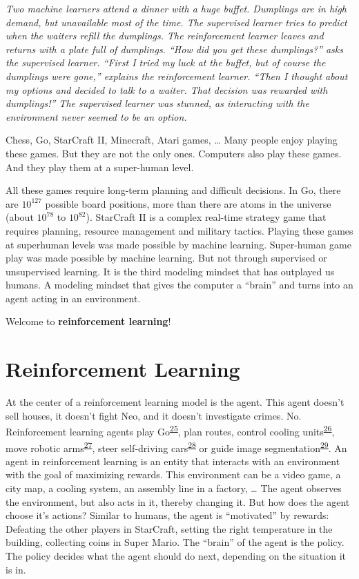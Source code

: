 \documentclass[
  10pt,
]{scrbook}
\begin{document}
\emph{Two machine learners attend a dinner with a huge buffet.
Dumplings are in high demand, but unavailable most of the time.
The supervised learner tries to predict when the waiters refill the dumplings.
The reinforcement learner leaves and returns with a plate full of dumplings.
``How did you get these dumplings?'' asks the supervised learner.
``First I tried my luck at the buffet, but of course the dumplings were gone,'' explains the reinforcement learner.
``Then I thought about my options and decided to talk to a waiter.
That decision was rewarded with dumplings!''
The supervised learner was stunned, as interacting with the environment never seemed to be an option.}

Chess, Go, StarCraft II, Minecraft, Atari games, \ldots{}
Many people enjoy playing these games.
But they are not the only ones.
Computers also play these games.
And they play them at a super-human level.

All these games require long-term planning and difficult decisions.
In Go, there are \(10^{127}\) possible board positions, more than there are atoms in the universe (about \(10^{78}\) to \(10^{82}\)).
StarCraft II is a complex real-time strategy game that requires planning, resource management and military tactics.
Playing these games at superhuman levels was made possible by machine learning.
Super-human game play was made possible by machine learning.
But not through supervised or unsupervised learning.
It is the third modeling mindset that has outplayed us humans.
A modeling mindset that gives the computer a ``brain'' and turns into an agent acting in an environment.

Welcome to \textbf{reinforcement learning}!

\hypertarget{reinforcement-learning-1}{%
\section{Reinforcement Learning}\label{reinforcement-learning-1}}

At the center of a reinforcement learning model is the agent.
This agent doesn't sell houses, it doesn't fight Neo, and it doesn't investigate crimes.
No.~
Reinforcement learning agents play Go\textsuperscript{\protect\hyperlink{ref-silver2016mastering}{25}}, plan routes, control cooling units\textsuperscript{\protect\hyperlink{ref-li2019transforming}{26}}, move robotic arms\textsuperscript{\protect\hyperlink{ref-gu2017deep}{27}}, steer self-driving cars\textsuperscript{\protect\hyperlink{ref-kiran2021deep}{28}} or guide image segmentation\textsuperscript{\protect\hyperlink{ref-wang2018outline}{29}}.
An agent in reinforcement learning is an entity that interacts with an environment with the goal of maximizing rewards.
This environment can be a video game, a city map, a cooling system, an assembly line in a factory, \ldots{}
The agent observes the environment, but also acts in it, thereby changing it.
But how does the agent choose it's actions?
Similar to humans, the agent is ``motivated'' by rewards:
Defeating the other players in StarCraft, setting the right temperature in the building, collecting coins in Super Mario.
The ``brain'' of the agent is the policy.
The policy decides what the agent should do next, depending on the situation it is in.
\end{document}
